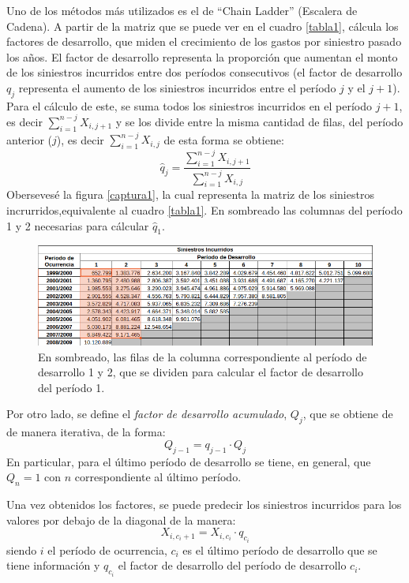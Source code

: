 \documentclass[
  12pt,
]{article}
\begin{document}
Uno de los métodos más utilizados es el de ``Chain Ladder'' (Escalera de
Cadena). A partir de la matriz que se puede ver en el cuadro
\ref{tabla1}, cálcula los factores de desarrollo, que miden el
crecimiento de los gastos por siniestro pasado los años. El factor de
desarrollo representa la proporción que aumentan el monto de los
siniestros incurridos entre dos períodos consecutivos (el factor de
desarrollo \(q_j\) representa el aumento de los siniestros incurridos
entre el período \(j\) y el \(j+1\)). Para el cálculo de este, se suma
todos los siniestros incurridos en el período \(j+1\), es decir
\(\sum_{i=1}^{n-j} X_{i,j+1}\) y se los divide entre la misma cantidad
de filas, del período anterior (\(j\)), es decir
\(\sum_{i=1}^{n-j} X_{i,j}\) de esta forma se obtiene: \[
\hat{q}_{j} = \frac{\sum_{i=1}^{n-j} X_{i,j+1}}{\sum_{i=1}^{n-j} X_{i,j}}
\] Obersevesé la figura \ref{captura1}, la cual representa la matriz de
los siniestros incrurridos,equivalente al cuadro \ref{tabla1}. En
sombreado las columnas del período 1 y 2 necesarias para cálcular
\(\hat{q}_{1}\).

\begin{figure}[ht]
\includegraphics[width=1\linewidth]{imagenes/captura1} \caption{\label{captura1} En sombreado, las filas de la columna correspondiente al período de desarrollo 1 y 2, que se dividen para calcular el factor de desarrollo del período 1.}\label{fig:unnamed-chunk-5}
\end{figure}

Por otro lado, se define el \emph{factor de desarrollo acumulado},
\(Q_{j}\), que se obtiene de de manera iterativa, de la forma: \[
Q_{j-1} = q_{j-1}\cdot Q_{j}
\] En particular, para el último período de desarrollo se tiene, en
general, que \(Q_n = 1\) con \(n\) correspondiente al último período.

Una vez obtenidos los factores, se puede predecir los siniestros
incurridos para los valores por debajo de la diagonal de la manera: \[
X_{i,c_i +1} = X_{i,c_i} \cdot q_{c_i}
\] siendo \(i\) el período de ocurrencia, \(c_i\) es el último período
de desarrollo que se tiene información y \(q_{c_i}\) el factor de
desarrollo del período de desarrollo \(c_i\).
\end{document}
